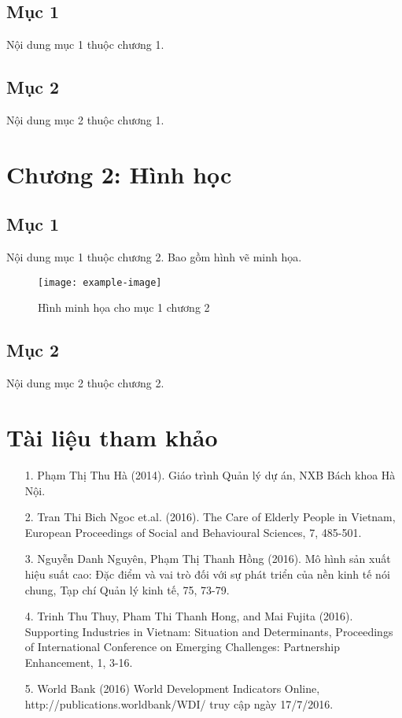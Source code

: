 \documentclass[a4paper]{book}
\begin{document}
\section{Mục 1}
Nội dung mục 1 thuộc chương 1.

\section{Mục 2}
Nội dung mục 2 thuộc chương 1.

\chapter{Chương 2: Hình học}
\section{Mục 1}
Nội dung mục 1 thuộc chương 2. Bao gồm hình vẽ minh họa.

\begin{figure}[h]
    \centering
    \texttt{[image: example-image]} %
    \caption{Hình minh họa cho mục 1 chương 2}
    \label{fig:example}
\end{figure}

\section{Mục 2}
Nội dung mục 2 thuộc chương 2.

\chapter*{Tài liệu tham khảo}
\begin{itemize}
    \item [1.] Phạm Thị Thu Hà (2014). Giáo trình Quản lý dự án, NXB Bách khoa Hà Nội.
    \item [2.] Tran Thi Bich Ngoc et.al. (2016). The Care of Elderly People in Vietnam, European Proceedings of Social and Behavioural Sciences, 7, 485-501.
    \item [3.] Nguyễn Danh Nguyên, Phạm Thị Thanh Hồng (2016). Mô hình sản xuất hiệu suất cao: Đặc điểm và vai trò đối với sự phát triển của nền kinh tế nói chung, Tạp chí Quản lý kinh tế, 75, 73-79.
    \item [4.] Trinh Thu Thuy, Pham Thi Thanh Hong, and Mai Fujita (2016). Supporting Industries in Vietnam: Situation and Determinants, Proceedings of International Conference on Emerging Challenges: Partnership Enhancement, 1, 3-16.
    \item [5.] World Bank (2016) World Development Indicators Online, http://publications.worldbank/WDI/ truy cập ngày 17/7/2016.
\end{itemize}
\end{document}
